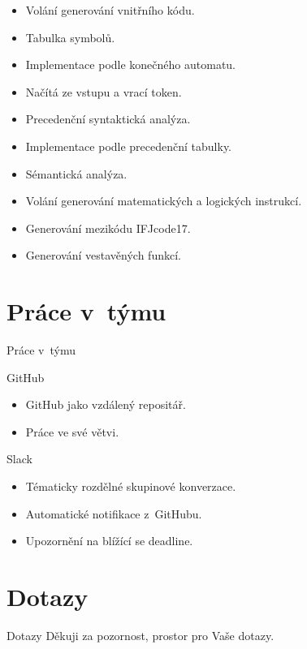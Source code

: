 \documentclass[11pt, hyperref={unicode}]{beamer}
\begin{document}
\begin{frame}
\begin{overprint}
\begin{itemize}
		\item Volání generování vnitřního kódu.
		\item Tabulka symbolů.
	\end{itemize}
    \begin{itemize}
		\item Implementace podle konečného automatu.
		\item Načítá ze vstupu a vrací token.
	\end{itemize}
    \begin{itemize}
		\item Precedenční syntaktická analýza.
		\item Implementace podle precedenční tabulky.
		\item Sémantická analýza.
		\item Volání generování matematických a logických instrukcí.
	\end{itemize}
    \begin{itemize}
		\item Generování mezikódu IFJcode17.
		\item Generování vestavěných funkcí.
	\end{itemize}
\end{overprint}

\end{frame}

\section{Práce v~týmu}

\begin{frame}{Práce v~týmu}
	\begin{alertblock}{GitHub}
		\begin{itemize}
			\item GitHub jako vzdálený repositář.
			\item Práce ve své větvi.
		\end{itemize}
	\end{alertblock}
	\begin{alertblock}{Slack}
		\begin{itemize}
			\item Tématicky rozdělné skupinové konverzace.
			\item Automatické notifikace z~GitHubu.
			\item Upozornění na blížící se deadline.
		\end{itemize}
	\end{alertblock}
	
\end{frame}

\section{Dotazy}

\begin{frame}{Dotazy}
	\vspace{-5cm}
	\Large{Děkuji za pozornost, prostor pro Vaše dotazy.}
\end{frame}
\end{document}
